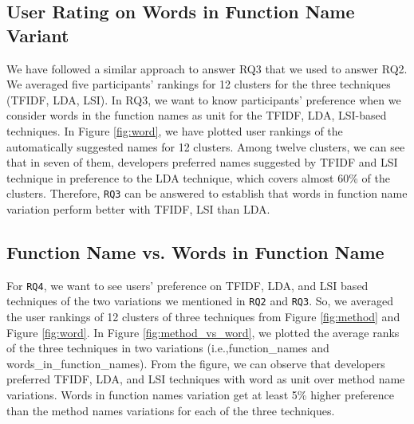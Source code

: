 \subsection{User Rating on Words in Function Name Variant}
We have followed a similar approach to answer RQ3 that we used to answer RQ2. We averaged five participants' rankings for 12 clusters for the three techniques (TFIDF, LDA, LSI). In RQ3, we want to know participants' preference when we consider words in the function names as unit for the TFIDF, LDA, LSI-based techniques. In Figure \ref{fig:word}, we have plotted user rankings of the automatically suggested names for 12 clusters. Among twelve clusters, we can see that in seven of them, developers preferred names suggested by TFIDF and LSI technique in preference to the LDA technique, which covers almost 60\% of the clusters. Therefore, \texttt{RQ3} can be answered to establish that words in function name variation perform better with TFIDF, LSI than LDA.      



\subsection{Function Name vs. Words in Function Name}
For \texttt{RQ4}, we want to see users' preference on TFIDF, LDA, and LSI based techniques of the two variations we mentioned in \texttt{RQ2} and \texttt{RQ3}.
So, we averaged the user rankings of 12 clusters of three techniques from Figure \ref{fig:method} and Figure \ref{fig:word}. In Figure \ref{fig:method_vs_word}, we plotted the average ranks of the three techniques in two variations (i.e.,function\_names and  words\_in\_function\_names). From the figure, we can observe that developers preferred TFIDF, LDA, and LSI techniques with word as unit over method name variations. Words in function names variation get at least 5\% higher preference than the method names variations for each of the three techniques. 

